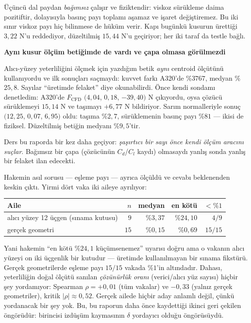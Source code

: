 \documentclass[11pt,a4paper]{article}
\newcommand{\kkkenar}{lacivert}
\newcommand{\kkzemin}{kod}
\newenvironment{renkkutu}[3]{%
  \renewcommand{\kkkenar}{#1}\renewcommand{\kkzemin}{#2}%
  \par\medskip\noindent
  \begin{lrbox}{\kutugovde}%
  \begin{minipage}{\dimexpr\linewidth-2\fboxsep-2\fboxrule\relax}\footnotesize
  \textcolor{#1}{\textbf{#3}}\par\vspace{3pt}%
}{%
  \end{minipage}%
  \end{lrbox}%
  \noindent\fcolorbox{\kkkenar}{\kkzemin}{\usebox{\kutugovde}}%
  \par\medskip
}
\newenvironment{dikkat}[1]{\begin{renkkutu}{orta}{ortabg}{#1}}{\end{renkkutu}}
\begin{document}
\noindent Üçüncü dal paydan \emph{bağımsız} çalışır ve fiziktendir: viskoz
sürükleme daima pozitiftir, dolayısıyla basınç payı toplamı aşamaz ve
işaret değiştiremez. Bu iki sınır viskoz payı hiç bilinmese de hüküm
verir. Kapı bugünkü kusurun ürettiği $3{,}22$ N'u reddediyor, düzeltilmiş
$15{,}44$ N'u geçiriyor; her iki taraf da testle bağlı.

\begin{dikkat}{Aynı kusur ölçüm betiğimde de vardı ve çapa olmasa
görülmezdi}
Alıcı-yüzey yeterliliğini ölçmek için yazdığım betik \emph{aynı} centroid
ölçütünü kullanıyordu ve ilk sonuçları saçmaydı: kuvvet farkı A320'de
\%$3767$, medyan \%$25{,}8$. Sayılar ``üretimde felaket'' diye okunabilirdi.
Önce kendi sondamı denetledim: A320'de $F_{\text{CFD}}$ $(4{,}04$,
$0{,}18$, $-39{,}40)$ N çıkıyordu, oysa çözücü sürüklemeyi $15{,}14$ N ve
taşımayı $+6{,}77$ N bildiriyor. Sarım normalleriyle sonuç
$(12{,}25$, $0{,}07$, $6{,}95)$ oldu: taşıma \%$2{,}7$, sürüklemenin basınç
payı \%$81$ --- ikisi de fiziksel. Düzeltilmiş betiğin medyanı
\%$9{,}5$'tir.

Ders bu raporda bir kez daha geçiyor: \emph{şaşırtıcı bir sayı önce kendi
ölçüm aracını suçlar}. Bağımsız bir çapa (çözücünün $C_d$/$C_l$ kaydı)
olmasaydı yanlış sonda yanlış bir felaket ilan edecekti.
\end{dikkat}

\noindent Hakemin asıl sorusu --- eşleme payı --- ayrıca ölçüldü ve
cevabı beklenenden keskin çıktı. Yirmi dört vaka iki aileye ayrılıyor:

\begin{center}\footnotesize
\begin{tabular}{@{}lrrrr@{}}
\toprule
\textbf{Aile} & $n$ & \textbf{medyan} & \textbf{en kötü} & $<\%1$ \\
\midrule
alıcı yüzey 12 üçgen (sınama kutusu) & $9$  & \%$3{,}37$ & \%$24{,}10$ & $4/9$ \\
gerçek geometri                      & $15$ & \%$0{,}15$ & \%$0{,}69$  & $15/15$ \\
\bottomrule
\end{tabular}
\end{center}

\noindent Yani hakemin ``en kötü \%$24{,}1$ küçümsenemez'' uyarısı doğru
ama o vakanın alıcı yüzeyi on iki üçgenlik bir kutudur --- üretimde
kullanılmayan bir sınama fikstürü. Gerçek geometrilerde eşleme payı
$15/15$ vakada \%$1$'in altındadır. Dahası, yeterliliğin doğal ölçütü
sanılan \emph{çözünürlük oranı} (verici/alıcı yüz sayısı) hiçbir şey
yordamıyor: Spearman $\rho = +0{,}01$ (tüm vakalar) ve $-0{,}33$ (yalnız
gerçek geometriler), kritik $|\rho| \approx 0{,}52$. Gerçek ailede hiçbir
aday anlamlı değil, çünkü yordanacak bir şey yok. Bu, bu raporun daha önce
kaydettiği ikinci geri çekilen öngörüdür: birincisi izdüşüm kaymasının
$\delta$ yordayıcı olduğu öngörüsüydü.
\end{document}

